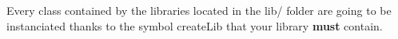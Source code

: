 Every class contained by the libraries located in the {\ttfamily lib/} folder are going to be instanciated thanks to the symbol {\ttfamily create\+Lib} that your library {\bfseries{must}} contain.


\begin{DoxyCode}{0}
\DoxyCodeLine{\{}
\DoxyCodeLine{\}}
\end{DoxyCode}
 